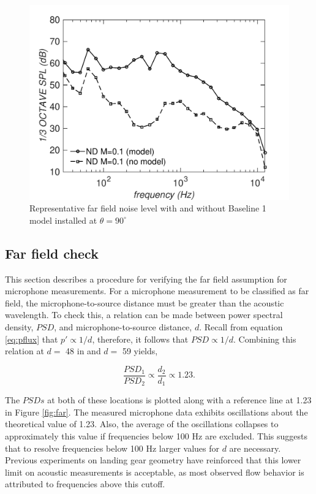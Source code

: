 \begin{figure}
	\begin{center}
		\centerline{\includegraphics[scale=0.7]{figures/mic_empty}}
		\caption{Representative far field noise level with and without Baseline 1 model installed at $\theta = 90^\circ$}
		\label{fig:empty}
	\end{center}
\end{figure}

\subsection{Far field check}
This section describes a procedure for verifying the far field assumption for microphone measurements.
For a microphone measurement to be classified as far field, the microphone-to-source distance must be greater than the acoustic wavelength. To check this, a relation can be made between power spectral density, $PSD$, and microphone-to-source distance, $d$. Recall from equation \ref{eq:pflux} that $p' \propto 1/d$, therefore, it follows that $PSD \propto 1/d$. Combining this relation at $d =$ 48 in and $d =$ 59 yields,

\begin{equation}
\frac{PSD_1}{PSD_2} \propto \frac{d_2}{d_1} \propto 1.23.
\end{equation}

The $PSDs$ at both of these locations is plotted along with a reference line at 1.23 in Figure \ref{fig:far}. The measured microphone data exhibits oscillations about the theoretical value of 1.23. Also, the average of the oscillations collapses to approximately this value if frequencies below 100 Hz are excluded. This suggests that to resolve frequencies below 100 Hz larger values for $d$ are necessary. Previous experiments on landing gear geometry have reinforced that this lower limit on acoustic measurements is acceptable, as most observed flow behavior is attributed to frequencies above this cutoff.
 
